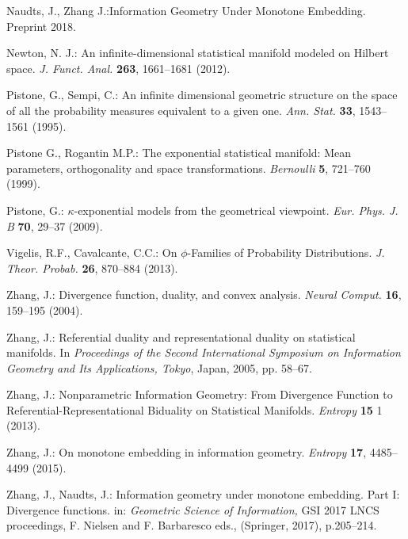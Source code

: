 \documentclass[graybox]{svmult}
\begin{document}
\begin{thebibliography}{99}
Naudts, J., Zhang J.:Information Geometry Under Monotone Embedding.
Preprint 2018.

Newton, N. J.:
An infinite-dimensional statistical manifold modeled on Hilbert space.
{\em J. Funct. Anal.} {\bf 263}, 1661--1681 (2012).

Pistone, G., Sempi, C.: An infinite dimensional geometric structure on the space 
of all the probability measures equivalent to a given one. {\em Ann. Stat.} {\bf 33}, 1543--1561 (1995).

Pistone G., Rogantin M.P.: The exponential statistical manifold: Mean parameters, 
orthogonality and space transformations. {\em Bernoulli} {\bf 5}, 
721--760 (1999).

Pistone, G.: $\kappa$-exponential models from the geometrical viewpoint. 
{\em Eur. Phys. J. B} {\bf 70}, 29--37 (2009).

Vigelis, R.F., Cavalcante, C.C.:
On $\phi$-Families of Probability Distributions.
{\em J. Theor. Probab.} {\bf 26}, 870--884 (2013).

Zhang, J.: Divergence function, duality, and convex analysis. {\em Neural 
Comput.} {\bf 16}, 159--195 (2004).

Zhang, J.:
Referential duality and representational duality on statistical manifolds.
In {\it Proceedings of the Second International Symposium on Information Geometry and Its Applications, Tokyo},
Japan, 2005, pp. 58--67.

Zhang, J.: Nonparametric Information Geometry: From Divergence
Function to Referential-Representational Biduality on
Statistical Manifolds.
{\em Entropy} {\bf 15} 1 (2013).

Zhang, J.: On monotone embedding in information geometry.
{\em Entropy}  {\bf 17}, 4485--4499 (2015).

Zhang, J., Naudts, J.: Information geometry under monotone embedding. Part I: Divergence functions.
in: {\em Geometric Science of Information,}
GSI 2017 LNCS proceedings,
F. Nielsen and F. Barbaresco eds., (Springer, 2017), p.205--214. 


\end{thebibliography}
\end{document}
